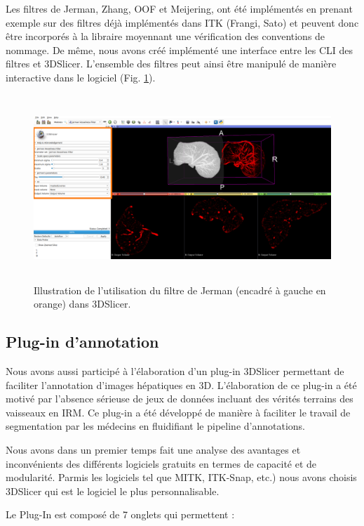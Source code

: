 Les filtres de Jerman, Zhang, OOF et Meijering, ont été implémentés en prenant exemple sur des filtres déjà implémentés dans ITK (Frangi, Sato) et peuvent donc être incorporés à la libraire moyennant une vérification des conventions de nommage. De même, nous avons créé implémenté une interface entre les CLI des filtres et 3DSlicer. L'ensemble des filtres peut ainsi être manipulé de manière interactive dans le logiciel (Fig. \ref{fig:slicer_vesselness}).

\begin{figure}[H]
    \includegraphics[height=7cm]{Images/slicer_jerman.png}
    \caption{Illustration de l'utilisation du filtre de Jerman (encadré à gauche en orange) dans 3DSlicer.}
    \label{fig:slicer_vesselness}
\end{figure}

\subsection{Plug-in d'annotation}

Nous avons aussi participé à l'élaboration d'un plug-in 3DSlicer permettant de faciliter l'annotation d'images hépatiques en 3D. L'élaboration de ce plug-in a été motivé par l'absence sérieuse de jeux de données incluant des vérités terrains des vaisseaux en IRM. Ce plug-in a été développé de manière à faciliter le travail de segmentation par les médecins en fluidifiant le pipeline d'annotations.

Nous avons dans un premier temps fait une analyse des avantages et inconvénients des différents logiciels gratuits en termes de capacité et de modularité. Parmis les logiciels tel que MITK, ITK-Snap, etc.) nous avons choisis 3DSlicer qui est le logiciel le plus personnalisable.

Le Plug-In est composé de 7 onglets qui permettent :

